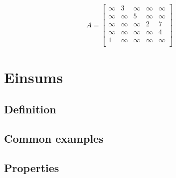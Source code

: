 \begin{align*}
    A = \begin{bmatrix}
    \infty & 3 & \infty & \infty & \infty \\
    \infty & \infty & 5 & \infty & \infty \\
    \infty & \infty & \infty & 2 & 7 \\
    \infty & \infty & \infty & \infty & 4 \\
    1 & \infty & \infty & \infty & \infty \\
    \end{bmatrix}
\end{align*}
\section{Einsums}
\subsection{Definition}
\subsection{Common examples}
\subsection{Properties}